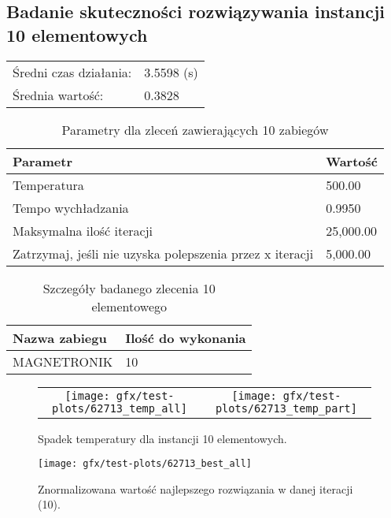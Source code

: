 \subsection{Badanie skuteczności rozwiązywania instancji 10 elementowych}
\begin{table}[H]
\begin{tabular}{ l l }
	Średni czas działania: & 3.5598 (s) \\
Średnia wartość: & 0.3828 \\
\end{tabular}
\end{table}
\begin{table}[H]
\centering
\begin{tabularx}{1\textwidth}{ | l | X | }
\hline
\bfseries Parametr & \bfseries Wartość \\
\hline
Temperatura & 500.00 \\
\hline
Tempo wychładzania & 0.9950 \\
\hline
Maksymalna ilość iteracji & 25,000.00 \\
\hline
Zatrzymaj, jeśli nie uzyska polepszenia przez x iteracji & 5,000.00 \\
\hline
\end{tabularx}
\caption{Parametry dla zleceń zawierających 10 zabiegów}
\end{table}

\begin{table}[H]
\centering
\begin{tabularx}{1\textwidth}{ | X | l | }
\hline
\bfseries Nazwa zabiegu & \bfseries Ilość do wykonania \\
\hline
MAGNETRONIK & 10 \\
\hline
\end{tabularx}
\caption{Szczegóły badanego zlecenia 10 elementowego}
\end{table}
\begin{figure}[H]
\centering
\begin{table}[H]
\centering
\begin{tabularx}{1\textwidth}{ c c }
\texttt{[image: gfx/test-plots/62713\_temp\_all]} & \texttt{[image: gfx/test-plots/62713\_temp\_part]} \\
\end{tabularx}
\end{table}
\caption{Spadek temperatury dla instancji 10 elementowych.}
\end{figure}
\begin{figure}[H]
\centering
\texttt{[image: gfx/test-plots/62713\_best\_all]}
\caption{Znormalizowana wartość najlepszego rozwiązania w danej iteracji (10).}
\label{temp-10}
\end{figure}

